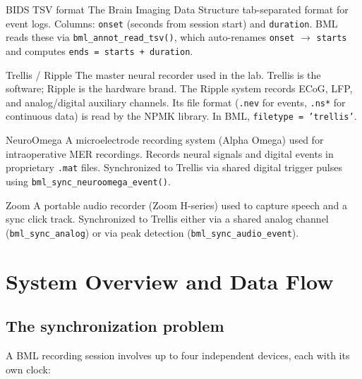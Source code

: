 \documentclass[11pt, a4paper]{article}
\begin{document}
\begin{glossentry}{BIDS TSV format}
The Brain Imaging Data Structure tab-separated format for event logs. Columns: \texttt{onset} (seconds from session start) and \texttt{duration}. BML reads these via \texttt{bml\_annot\_read\_tsv()}, which auto-renames \texttt{onset} $\to$ \texttt{starts} and computes \texttt{ends = starts + duration}.
\end{glossentry}

\begin{glossentry}{Trellis / Ripple}
The master neural recorder used in the lab. Trellis is the software; Ripple is the hardware brand. The Ripple system records ECoG, LFP, and analog/digital auxiliary channels. Its file format (\texttt{.nev} for events, \texttt{.ns*} for continuous data) is read by the NPMK library. In BML, \texttt{filetype = 'trellis'}.
\end{glossentry}

\begin{glossentry}{NeuroOmega}
A microelectrode recording system (Alpha Omega) used for intraoperative MER recordings. Records neural signals and digital events in proprietary \texttt{.mat} files. Synchronized to Trellis via shared digital trigger pulses using \texttt{bml\_sync\_neuroomega\_event()}.
\end{glossentry}

\begin{glossentry}{Zoom}
A portable audio recorder (Zoom H-series) used to capture speech and a sync click track. Synchronized to Trellis either via a shared analog channel (\texttt{bml\_sync\_analog}) or via peak detection (\texttt{bml\_sync\_audio\_event}).
\end{glossentry}

\newpage
\section{System Overview and Data Flow}
\label{sec:overview}

\subsection{The synchronization problem}

A BML recording session involves up to four independent devices, each with its own clock:
\end{document}
